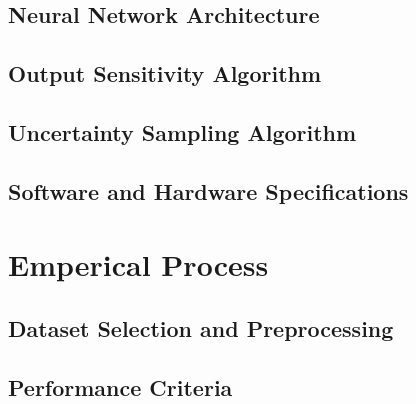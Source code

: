 \documentclass[10pt, conference]{IEEEtran}
\begin{document}
\subsection{Neural Network Architecture}

\subsection{Output Sensitivity Algorithm}

\subsection{Uncertainty Sampling Algorithm}

\subsection{Software and Hardware Specifications}



\section{Emperical Process}
\subsection{Dataset Selection and Preprocessing}

\subsection{Performance Criteria}
\end{document}
